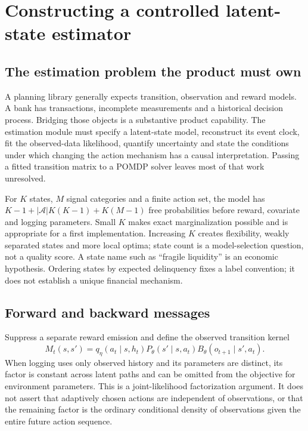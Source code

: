 \chapter{Constructing a controlled latent-state estimator}\label{ch:latentestimation}
\section{The estimation problem the product must own}
A planning library generally expects transition, observation and reward
models. A bank has transactions, incomplete measurements and a historical
decision process. Bridging those objects is a substantive product capability.
The estimation module must specify a latent-state model, reconstruct its
event clock, fit the observed-data likelihood, quantify uncertainty and
state the conditions under which changing the action mechanism has a
causal interpretation. Passing a fitted transition matrix to a
POMDP solver leaves most of that work unresolved.

For $K$ states, $M$ signal categories and a finite action set, the model
has $K-1+|\mathcal A|K(K-1)+K(M-1)$ free probabilities before
reward, covariate and logging parameters. Small $K$ makes exact
marginalization possible and is appropriate for a first implementation.
Increasing $K$ creates flexibility, weakly separated states and more local
optima; state count is a model-selection question, not a quality score.
A state name such as ``fragile liquidity'' is an economic hypothesis.
Ordering states by expected delinquency fixes a label convention; it does
not establish a unique financial mechanism.

\section{Forward and backward messages}
Suppress a separate reward emission and define the observed transition kernel
\[
 M_t(s,s')=q_\eta(a_t\mid s,h_t)
          P_\theta(s'\mid s,a_t)B_\theta(o_{t+1}\mid s',a_t).
\]
When logging uses only observed history and its parameters are distinct,
its factor is constant across latent paths and can be omitted from the
objective for environment parameters. This is a joint-likelihood
factorization argument. It does not assert that adaptively chosen actions
are independent of observations, or that the remaining factor is the
ordinary conditional density of observations given the entire future
action sequence.

